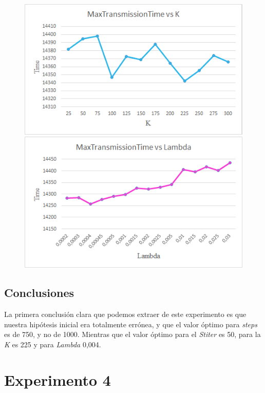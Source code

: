 \documentclass[a4paper,10pt]{report}
\begin{document}
        \begin{figure}[H]
          \includegraphics[width=\linewidth]{images/Time vs K.png}
        \endminipage\hfill
          \includegraphics[width=\linewidth]{images/Time vs Lambda.png}
        \endminipage
        \end{figure}
        
        \subsection*{Conclusiones}
        La primera conclusión clara que podemos extraer de este experimento es que nuestra hipótesis inicial era totalmente errónea, y que el valor óptimo para \textit{steps} es de 750, y no de 1000. Mientras que el valor óptimo para el \textit{Stiter} es 50, para la \textit{K} es 225 y para \textit{Lambda} 0,004.
		
		
		
	\newpage
	\section*{Experimento 4}
\end{document}
